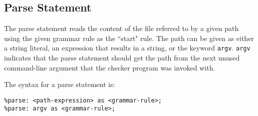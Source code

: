 
\subsection{Parse Statement}
{
	The parse statement reads the content of
	the file referred to by a given path
	using the given grammar rule as the ``start" rule.
	The path can be given as either a
	string literal, an expression that results in a string, or the
	keyword \texttt{argv}.
	\texttt{argv} indicates that the parse statement should get the path from
	the next unused command-line argument that the checker program was invoked
	with.
	
	The syntax for a parse statement is:
	\begin{lstlisting}[numbers = none, texcl = true, language = MAIA]
%parse: "path/to/file" as <grammar-rule>;
%parse: <path-expression> as <grammar-rule>;
%parse: argv as <grammar-rule>;
	\end{lstlisting}
}
